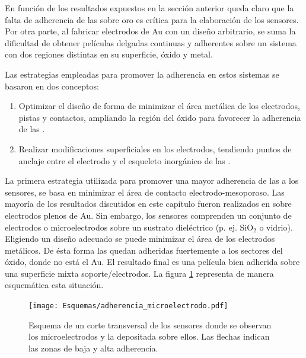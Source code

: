 			 En función de los resultados expuestos en la sección anterior queda claro que la falta de adherencia de las \pdm\space sobre oro es crítica para la elaboración de los sensores. Por otra parte, al fabricar electrodos de Au con un diseño arbitrario, se suma la dificultad de obtener películas delgadas continuas y adherentes sobre un sistema con dos regiones distintas en su superficie, óxido y metal.
 
             Las estrategias empleadas para promover la adherencia en estos sistemas se basaron en dos conceptos:
				\begin{enumerate}

					\item Optimizar el diseño de forma de minimizar el área metálica de los electrodos, pistas y contactos, ampliando la región del óxido para favorecer la adherencia de las \pdm.

					\item Realizar modificaciones superficiales en los electrodos, tendiendo puntos de anclaje entre el electrodo y el esqueleto inorgánico de las \pdm.

					\end{enumerate}
			
			 La primera estrategia utilizada para promover una mayor adherencia de las \pdm\space a los sensores, se basa en minimizar el área de contacto electrodo-mesoporoso. Las mayoría de los resultados discutidos en este capítulo fueron realizados en \pdm\space sobre electrodos plenos de Au. Sin embargo, los sensores comprenden un conjunto de electrodos o microelectrodos sobre un sustrato dieléctrico (p. ej. SiO$_2$ o vidrio). Eligiendo un diseño adecuado se puede minimizar el área de los electrodos metálicos. De ésta forma las \pdm\space quedan adheridas fuertemente a los sectores del óxido, donde no está el Au. El resultado final es una película bien adherida sobre una superficie mixta soporte/electrodos.  La figura \ref{fig:adherencia_microelectrodo} representa de manera esquemática esta situación.
			
				\begin{figure}[!ht]
					\begin{center}
					\texttt{[image: Esquemas/adherencia\_microelectrodo.pdf]}
					\caption[Adherencia a los microelectrodos.]{Esquema de un corte transversal de los sensores donde se observan los microelectrodos y la \pdm\space depositada sobre ellos. Las flechas indican las zonas de baja y alta adherencia.}
					\label{fig:adherencia_microelectrodo}
					\end{center}
					\end{figure}
					
